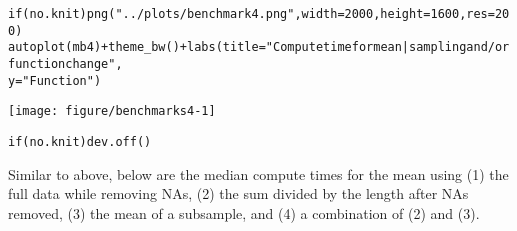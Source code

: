 \documentclass{article}\usepackage[]{graphicx}\usepackage[]{color}
\makeatletter
\def\maxwidth{ %
  \ifdim\Gin@nat@width>\linewidth
    \linewidth
  \else
    \Gin@nat@width
  \fi
}
\newcommand{\hlnum}[1]{\textcolor[rgb]{0.863,0.196,0.184}{#1}}%
\newcommand{\hlstr}[1]{\textcolor[rgb]{0.863,0.196,0.184}{#1}}%
\newcommand{\hlopt}[1]{\textcolor[rgb]{0.576,0.631,0.631}{#1}}%
\newcommand{\hlstd}[1]{\textcolor[rgb]{0.514,0.58,0.588}{#1}}%
\newcommand{\hlkwa}[1]{\textcolor[rgb]{0.796,0.294,0.086}{#1}}%
\newcommand{\hlkwc}[1]{\textcolor[rgb]{0.796,0.294,0.086}{#1}}%
\newcommand{\hlkwd}[1]{\textcolor[rgb]{0.576,0.631,0.631}{#1}}%
\newenvironment{kframe}{%
 \def\at@end@of@kframe{}%
 \ifinner\ifhmode%
  \def\at@end@of@kframe{\end{minipage}}%
  \begin{minipage}{\columnwidth}%
 \fi\fi%
 \def\FrameCommand##1{\hskip\@totalleftmargin \hskip-\fboxsep
 \colorbox{shadecolor}{##1}\hskip-\fboxsep
     \hskip-\linewidth \hskip-\@totalleftmargin \hskip\columnwidth}%
 \MakeFramed {\advance\hsize-\width
   \@totalleftmargin\z@ \linewidth\hsize
   \@setminipage}}%
 {\par\unskip\endMakeFramed%
 \at@end@of@kframe}
\newenvironment{knitrout}{}{} %
\makeatother
\begin{document}
\begin{knitrout}
\begin{kframe}
\begin{alltt}
\hlkwa{if} \hlstd{(no.knit)} \hlkwd{png}\hlstd{(}\hlstr{"../plots/benchmark4.png"}\hlstd{,} \hlkwc{width} \hlstd{=} \hlnum{2000}\hlstd{,} \hlkwc{height} \hlstd{=} \hlnum{1600}\hlstd{,} \hlkwc{res} \hlstd{=} \hlnum{200}\hlstd{)}
\hlkwd{autoplot}\hlstd{(mb4)} \hlopt{+} \hlkwd{theme_bw}\hlstd{()} \hlopt{+} \hlkwd{labs}\hlstd{(}\hlkwc{title} \hlstd{=} \hlstr{"Compute time for mean | sampling and/or function change"}\hlstd{,}
    \hlkwc{y} \hlstd{=} \hlstr{"Function"}\hlstd{)}
\end{alltt}
\end{kframe}
\texttt{[image: figure/benchmarks4-1]} 
\begin{kframe}\begin{alltt}
\hlkwa{if} \hlstd{(no.knit)} \hlkwd{dev.off}\hlstd{()}
\end{alltt}
\end{kframe}
\end{knitrout}

Similar to above, below are the median compute times for the mean using (1) the full data while removing NAs, (2) the sum divided by the length after NAs removed, (3) the mean of a subsample, and (4) a combination of (2) and (3).
\end{document}
